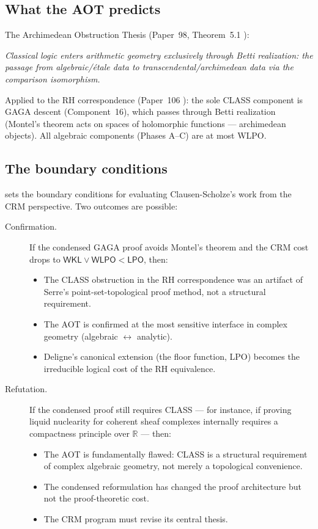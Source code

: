 \documentclass[11pt,a4paper]{article}
\theoremstyle{plain}
\theoremstyle{definition}
\newcommand{\WKL}{\textsf{WKL}}
\newcommand{\WLPO}{\textsf{WLPO}}
\newcommand{\LPO}{\textsf{LPO}}
\newcommand{\CLASS}{\textsf{CLASS}}
\newcommand{\R}{\mathbb{R}}
\begin{document}
\subsection{What the AOT predicts}

The Archimedean Obstruction Thesis (Paper~98, Theorem~5.1 \cite{Paper98}):

\medskip
\noindent\textit{Classical logic enters arithmetic geometry exclusively through Betti realization: the passage from algebraic/étale data to transcendental/archimedean data via the comparison isomorphism.}
\medskip

Applied to the RH correspondence (Paper~106 \cite{Paper106}): the sole \CLASS{} component is GAGA descent (Component~16), which passes through Betti realization (Montel's theorem acts on spaces of holomorphic functions --- archimedean objects).
All algebraic components (Phases A--C) are at most \WLPO.

\subsection{The boundary conditions}

 sets the boundary conditions for evaluating Clausen-Scholze's work from the CRM perspective.
Two outcomes are possible:

\begin{description}
\item[Confirmation.] If the condensed GAGA proof avoids Montel's theorem and the CRM cost drops to $\WKL \vee \WLPO < \LPO$, then:
\begin{itemize}[nosep]
\item The \CLASS{} obstruction in the RH correspondence was an artifact of Serre's point-set-topological proof method, not a structural requirement.
\item The AOT is confirmed at the most sensitive interface in complex geometry (algebraic $\leftrightarrow$ analytic).
\item Deligne's canonical extension (the floor function, \LPO) becomes the irreducible logical cost of the RH equivalence.
\end{itemize}

\item[Refutation.] If the condensed proof still requires \CLASS{} --- for instance, if proving liquid nuclearity for coherent sheaf complexes internally requires a compactness principle over $\R$ --- then:
\begin{itemize}[nosep]
\item The AOT is fundamentally flawed: \CLASS{} is a structural requirement of complex algebraic geometry, not merely a topological convenience.
\item The condensed reformulation has changed the proof architecture but not the proof-theoretic cost.
\item The CRM program must revise its central thesis.
\end{itemize}
\end{description}
\end{document}

